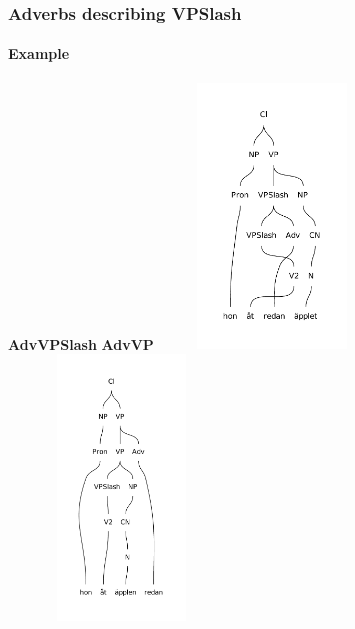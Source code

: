 \documentclass[10pt]{beamer}
\begin{document}
\begin{frame}
\frametitle{Adverbs describing VPSlash}
\framesubtitle{Example} 
\small{\textbf{AdvVPSlash}}\hspace{160pt}
\small{\textbf{AdvVP}}
\includegraphics[width=170pt,height=200pt]{advVP.pdf}
\includegraphics[width=170pt,height=200pt]{advVP2.pdf}
\end{frame}
\end{document}
